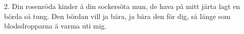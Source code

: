 2.  Din rosenröda kinder å din sockersöta mun,
    de hava på mitt järta lagt en börda så tung.
    Den bördan vill ja bära, ja bära den för dig,
    så länge som blodsdropparna ä varma uti mig.
